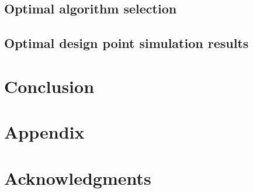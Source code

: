 \documentclass[conf]{new-aiaa}
\begin{document}
\subsection{Optimal algorithm selection}

\subsection{Optimal design point simulation results}

\section{Conclusion}


\section*{Appendix}


\section*{Acknowledgments}



\end{document}
